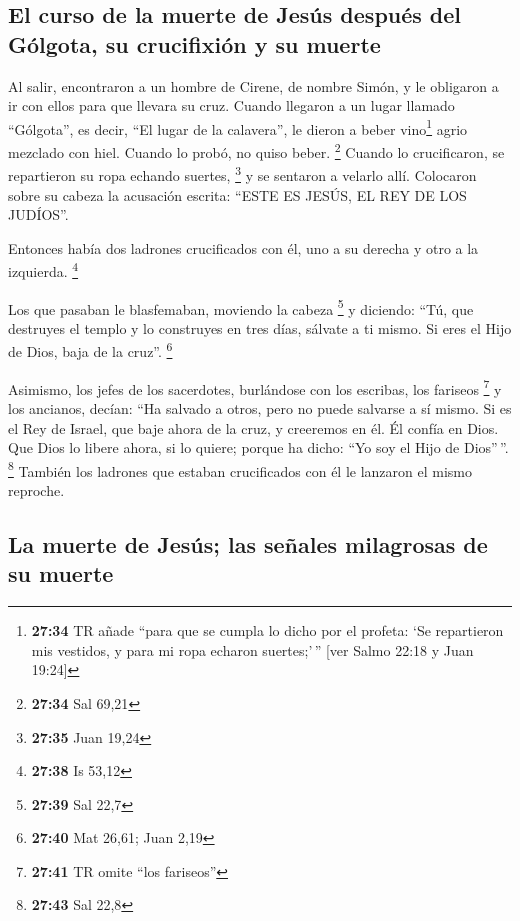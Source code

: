 \begin{paracol}{2}
{\subsection{El curso de la muerte de Jesús después del Gólgota, su
crucifixión y su
muerte}\label{el-curso-de-la-muerte-de-jesuxfas-despuuxe9s-del-guxf3lgota-su-crucifixiuxf3n-y-su-muerte}}

 Al salir, encontraron a un hombre de Cirene, de nombre
Simón, y le obligaron a ir con ellos para que llevara su cruz.
 Cuando llegaron a un lugar llamado ``Gólgota'', es
decir, ``El lugar de la calavera'',  le dieron a beber
vino\footnote{\textbf{27:34} TR añade ``para que se cumpla lo dicho por
  el profeta: `Se repartieron mis vestidos, y para mi ropa echaron
  suertes;'\,'' {[}ver Salmo 22:18 y Juan 19:24{]}} agrio mezclado con
hiel. Cuando lo probó, no quiso beber. \footnote{\textbf{27:34} Sal
  69,21}  Cuando lo crucificaron, se repartieron su ropa
echando suertes, \footnote{\textbf{27:35} Juan 19,24}  y
se sentaron a velarlo allí.  Colocaron sobre su cabeza la
acusación escrita: ``ESTE ES JESÚS, EL REY DE LOS JUDÍOS''.

 Entonces había dos ladrones crucificados con él, uno a
su derecha y otro a la izquierda. \footnote{\textbf{27:38} Is 53,12}

 Los que pasaban le blasfemaban, moviendo la cabeza
\footnote{\textbf{27:39} Sal 22,7}  y diciendo: ``Tú, que
destruyes el templo y lo construyes en tres días, sálvate a ti mismo. Si
eres el Hijo de Dios, baja de la cruz''. \footnote{\textbf{27:40} Mat
  26,61; Juan 2,19}

 Asimismo, los jefes de los sacerdotes, burlándose con
los escribas, los fariseos \footnote{\textbf{27:41} TR omite ``los
  fariseos''} y los ancianos, decían:  ``Ha salvado a
otros, pero no puede salvarse a sí mismo. Si es el Rey de Israel, que
baje ahora de la cruz, y creeremos en él.  Él confía en
Dios. Que Dios lo libere ahora, si lo quiere; porque ha dicho: ``Yo soy
el Hijo de Dios''\,''. \footnote{\textbf{27:43} Sal 22,8}
 También los ladrones que estaban crucificados con él le
lanzaron el mismo reproche.

\hypertarget{la-muerte-de-jesuxfas-las-seuxf1ales-milagrosas-de-su-muerte}{%
\subsection{La muerte de Jesús; las señales milagrosas de su
muerte}\label{la-muerte-de-jesuxfas-las-seuxf1ales-milagrosas-de-su-muerte}}


\end{paracol}
